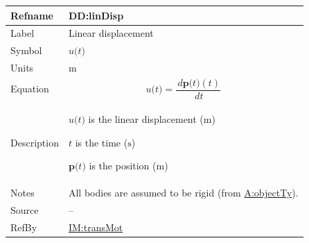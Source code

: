\documentclass[12pt]{article}
\begin{document}
\vspace{\baselineskip}
\noindent
\begin{minipage}{\textwidth}
\begin{tabular}{>{\raggedright}p{}>{\raggedright\arraybackslash}p{}}
\toprule \textbf{Refname} & \textbf{DD:linDisp}
\label{DD:linDisp}
\\ \midrule
Label & Linear displacement
        
\\ \midrule
Symbol & $u\text{(}t\text{)}$
         
\\ \midrule
Units & ${\text{m}}$
        
\\ \midrule
Equation & \begin{displaymath}
           u\text{(}t\text{)}=\frac{\,d\symbf{p}\text{(}t\text{)}\left(t\right)}{\,dt}
           \end{displaymath}
\\ \midrule
Description & \begin{symbDescription}
              \item{$u\text{(}t\text{)}$ is the linear displacement (${\text{m}}$)}
              \item{$t$ is the time (${\text{s}}$)}
              \item{$\symbf{p}\text{(}t\text{)}$ is the position (${\text{m}}$)}
              \end{symbDescription}
\\ \midrule
Notes & All bodies are assumed to be rigid (from \hyperref[assumpOT]{A:objectTy}).
        
\\ \midrule
Source & --
         
\\ \midrule
RefBy & \hyperref[IM:transMot]{IM:transMot}
        
\\ \bottomrule
\end{tabular}
\end{minipage}
\end{document}
